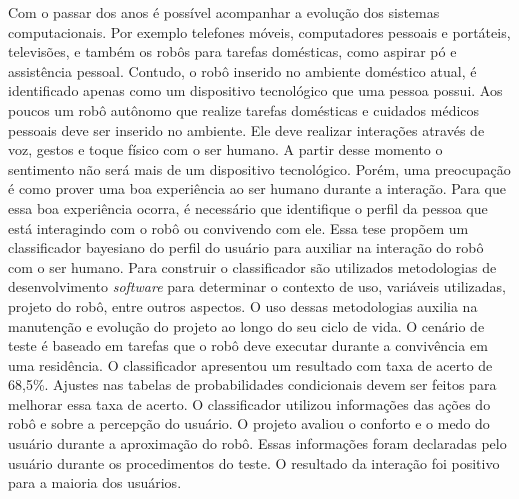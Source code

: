 
\begin{resumo}
Com o passar dos anos é possível acompanhar a evolução dos sistemas computacionais. Por exemplo telefones móveis, computadores pessoais e portáteis, televisões, e também os robôs para tarefas domésticas, como aspirar pó e assistência pessoal. Contudo, o robô inserido no ambiente doméstico atual, é identificado apenas como um dispositivo tecnológico que uma pessoa possui. Aos poucos um robô autônomo que realize tarefas domésticas e cuidados médicos pessoais deve ser inserido no ambiente. Ele deve realizar interações através de voz, gestos e toque físico com o ser humano. A partir desse momento o sentimento não será mais de um dispositivo tecnológico. Porém, uma preocupação é como prover uma boa experiência ao ser humano durante a interação. Para que essa boa experiência ocorra, é necessário que identifique o perfil da pessoa que está interagindo com o robô ou convivendo com ele. Essa tese propõem um classificador bayesiano do perfil do usuário para auxiliar na interação do robô com o ser humano. Para construir o classificador são utilizados metodologias de desenvolvimento \emph{software} para determinar o contexto de uso, variáveis utilizadas, projeto do robô, entre outros aspectos. O uso dessas metodologias auxilia na manutenção e evolução do projeto ao longo do seu ciclo de vida. O cenário de teste é baseado em tarefas que o robô deve executar durante a convivência em uma residência. O classificador apresentou um resultado com taxa de acerto de 68,5\%. Ajustes nas tabelas de probabilidades condicionais devem ser feitos para melhorar essa taxa de acerto. O classificador utilizou informações das ações do robô e sobre a percepção do usuário. O projeto avaliou o conforto e o medo do usuário durante a aproximação do robô. Essas informações foram declaradas pelo usuário durante os procedimentos do teste. O resultado da interação foi positivo para a maioria dos usuários.



\end{resumo}
